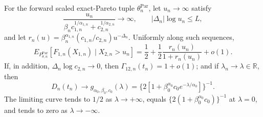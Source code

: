 For the forward scaled exact-Pareto tuple \(\theta_n^{\mathrm{Par}}\), let \(u_n\to\infty\) satisfy
\[
\frac{u_n}{\beta_n c_{1,n}^{1/\alpha_{1,n}}+c_{2,n}^{1/\alpha_{2,n}}}\to\infty,
\qquad |\Delta_n|\log u_n\leq L,
\]
and let \(r_n(u)=\beta_n^{\alpha_{1,n}}(c_{1,n}/c_{2,n})u^{-\Delta_n}\). Uniformly along such sequences,
\[
E_{P_{\theta,n}^{\mathrm{Par}}}[F_{1,n}(X_{1,n})\mid X_{2,n}>u_n]
=\frac12+\frac12\frac{r_n(u_n)}{1+r_n(u_n)}+o(1).
\]
If, in addition, \(\Delta_n\log c_{2,n}\to0\), then \(\Gamma_{12,n}(t_n)=1+o(1)\); and if \(\lambda_n\to\lambda\in\mathbb R\), then
\[
D_n(t_n)\to g_{\alpha_0,\beta_0,c_0}(\lambda)
=\{2[1+\beta_0^{\alpha_0}c_0e^{-\lambda/\alpha_0}]\}^{-1}.
\]
The limiting curve tends to \(1/2\) as \(\lambda\to+\infty\), equals \(\{2(1+\beta_0^{\alpha_0}c_0)\}^{-1}\) at \(\lambda=0\), and tends to zero as \(\lambda\to-\infty\).